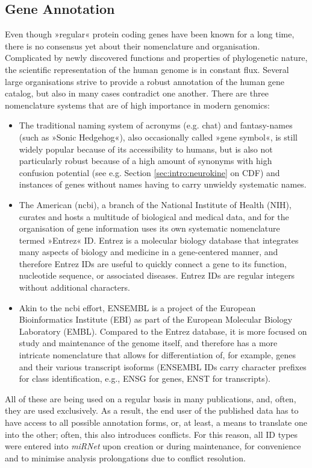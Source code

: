 \subsection{Gene Annotation}
Even though »regular« protein coding genes have been known for a long time, there is no consensus yet about their nomenclature and organisation. Complicated by newly discovered functions and properties of phylogenetic nature, the scientific representation of the human genome is in constant flux. Several large organisations strive to provide a robust annotation of the human gene catalog, but also in many cases contradict one another. There are three nomenclature systems that are of high importance in modern genomics: 
\begin{itemize}
\item The traditional naming system of acronyms (e.g. \ac{chat}) and fantasy-names (such as »Sonic Hedgehog«), also occasionally called »gene symbol«, is still widely popular because of its accessibility to humans, but is also not particularly robust because of a high amount of synonyms with high confusion potential (see e.g. Section \ref{sec:intro:neurokine} on CDF) and instances of genes without names having to carry unwieldy systematic names.
\item The American (\ac{ncbi}), a branch of the National Institute of Health (NIH), curates and hosts a multitude of biological and medical data, and for the organisation of gene information uses its own systematic nomenclature termed »Entrez« ID. Entrez is a molecular biology database that integrates many aspects of biology and medicine in a gene-centered manner, and therefore Entrez IDs are useful to quickly connect a gene to its function, nucleotide sequence, or associated diseases. Entrez IDs are regular integers without additional characters.
\item Akin to the \ac{ncbi} effort, ENSEMBL is a project of the European Bioinformatics Institute (EBI) as part of the European Molecular Biology Laboratory (EMBL). Compared to the Entrez database, it is more focused on study and maintenance of the genome itself, and therefore has a more intricate nomenclature that allows for differentiation of, for example, genes and their various transcript isoforms (ENSEMBL IDs carry character prefixes for class identification, e.g., ENSG for genes, ENST for transcripts).
\end{itemize}
All of these are being used on a regular basis in many publications, and, often, they are used exclusively. As a result, the end user of the published data has to have access to all possible annotation forms, or, at least, a means to translate one into the other; often, this also introduces conflicts. For this reason, all ID types were entered into \textit{miRNet} upon creation or during maintenance, for convenience and to minimise analysis prolongations due to conflict resolution.

